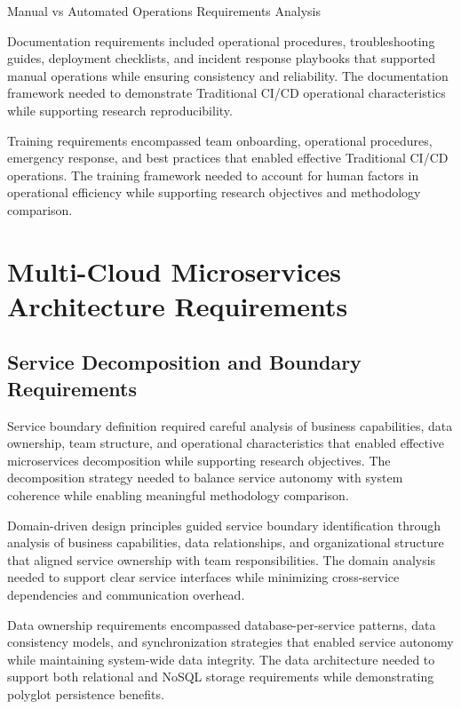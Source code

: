\begin{table}[H]
\centering
\caption{Manual vs Automated Operations Requirements Analysis}
\label{tab:manual-automated-operations}
\end{table}

Documentation requirements included operational procedures, troubleshooting guides, deployment checklists, and incident response playbooks that supported manual operations while ensuring consistency and reliability. The documentation framework needed to demonstrate Traditional CI/CD operational characteristics while supporting research reproducibility.

Training requirements encompassed team onboarding, operational procedures, emergency response, and best practices that enabled effective Traditional CI/CD operations. The training framework needed to account for human factors in operational efficiency while supporting research objectives and methodology comparison.

\section{Multi-Cloud Microservices Architecture Requirements}

\subsection{Service Decomposition and Boundary Requirements}

Service boundary definition required careful analysis of business capabilities, data ownership, team structure, and operational characteristics that enabled effective microservices decomposition while supporting research objectives. The decomposition strategy needed to balance service autonomy with system coherence while enabling meaningful methodology comparison.

Domain-driven design principles guided service boundary identification through analysis of business capabilities, data relationships, and organizational structure that aligned service ownership with team responsibilities. The domain analysis needed to support clear service interfaces while minimizing cross-service dependencies and communication overhead.

Data ownership requirements encompassed database-per-service patterns, data consistency models, and synchronization strategies that enabled service autonomy while maintaining system-wide data integrity. The data architecture needed to support both relational and NoSQL storage requirements while demonstrating polyglot persistence benefits.

